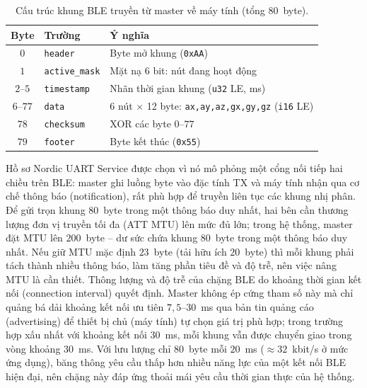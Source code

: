 \documentclass[../DoAn.tex]{subfiles}
\begin{document}
\begin{table}[h]
    \centering
    \caption{Cấu trúc khung BLE truyền từ master về máy tính (tổng $80$~byte).}
    \label{tab:bleframe}
    \begin{tabular}{cll}
        \hline
        \textbf{Byte} & \textbf{Trường}       & \textbf{Ý nghĩa}                                                     \\
        \hline
        $0$           & \texttt{header}       & Byte mở khung (\texttt{0xAA})                                        \\
        $1$           & \texttt{active\_mask} & Mặt nạ 6 bit: nút đang hoạt động                                     \\
        $2$--$5$      & \texttt{timestamp}    & Nhãn thời gian khung (\texttt{u32} LE, ms)                           \\
        $6$--$77$     & \texttt{data}         & 6 nút $\times$ 12 byte: \texttt{ax,ay,az,gx,gy,gz} (\texttt{i16} LE) \\
        $78$          & \texttt{checksum}     & XOR các byte $0$--$77$                                               \\
        $79$          & \texttt{footer}       & Byte kết thúc (\texttt{0x55})                                        \\
        \hline
    \end{tabular}
\end{table}

Hồ sơ Nordic UART Service được chọn vì nó mô phỏng một cổng nối tiếp hai chiều
trên BLE: master ghi luồng byte vào đặc tính TX và máy tính nhận qua cơ chế thông
báo (notification), rất phù hợp để truyền liên tục các khung nhị phân. Để gửi trọn khung $80$~byte trong một thông báo duy nhất, hai bên cần thương lượng đơn vị truyền tối đa (ATT MTU) lên mức đủ lớn; trong hệ thống, master đặt MTU lên $200$~byte -- dư sức chứa khung $80$~byte trong một thông báo duy nhất. Nếu giữ MTU mặc định $23$~byte (tải hữu ích $20$~byte) thì mỗi khung phải tách thành nhiều thông báo, làm tăng phần tiêu đề và độ trễ, nên việc nâng MTU là cần thiết. Thông lượng và độ trễ của chặng BLE do khoảng thời gian kết nối (connection interval) quyết định. Master không ép cứng tham số này mà chỉ quảng bá dải khoảng kết nối ưu tiên $7{,}5$--$30$~ms qua bản tin quảng cáo (advertising) để thiết bị chủ (máy tính) tự chọn giá trị phù hợp; trong trường hợp xấu nhất với khoảng kết nối $30$~ms, mỗi khung vẫn được chuyển giao trong vòng khoảng $30$~ms. Với lưu lượng chỉ $80$~byte
mỗi $20$~ms ($\approx 32$~kbit/s ở mức ứng dụng), băng thông yêu cầu thấp hơn
nhiều năng lực của một kết nối BLE hiện đại, nên chặng này đáp ứng thoải mái yêu
cầu thời gian thực của hệ thống.
\end{document}
